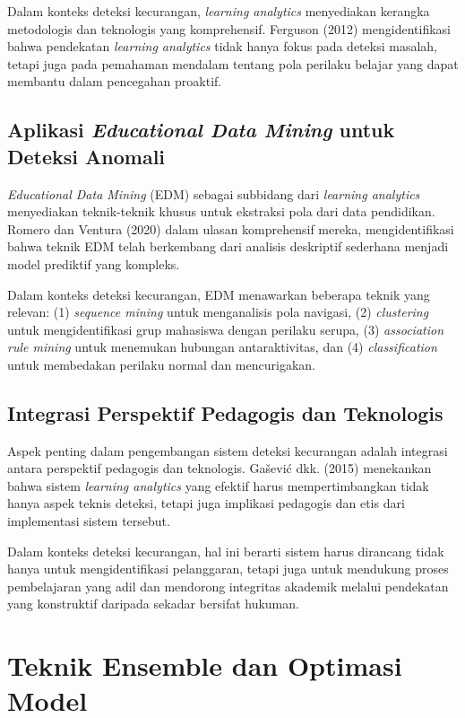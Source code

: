 Dalam konteks deteksi kecurangan, \textit{learning analytics} menyediakan kerangka metodologis dan teknologis yang komprehensif. Ferguson (2012) mengidentifikasi bahwa pendekatan \textit{learning analytics} tidak hanya fokus pada deteksi masalah, tetapi juga pada pemahaman mendalam tentang pola perilaku belajar yang dapat membantu dalam pencegahan proaktif.

\subsection{Aplikasi \textit{Educational Data Mining} untuk Deteksi Anomali}

\textit{Educational Data Mining} (EDM) sebagai subbidang dari \textit{learning analytics} menyediakan teknik-teknik khusus untuk ekstraksi pola dari data pendidikan. Romero dan Ventura (2020) dalam ulasan komprehensif mereka, mengidentifikasi bahwa teknik EDM telah berkembang dari analisis deskriptif sederhana menjadi model prediktif yang kompleks.

Dalam konteks deteksi kecurangan, EDM menawarkan beberapa teknik yang relevan: (1) \textit{sequence mining} untuk menganalisis pola navigasi, (2) \textit{clustering} untuk mengidentifikasi grup mahasiswa dengan perilaku serupa, (3) \textit{association rule mining} untuk menemukan hubungan antaraktivitas, dan (4) \textit{classification} untuk membedakan perilaku normal dan mencurigakan.

\subsection{Integrasi Perspektif Pedagogis dan Teknologis}

Aspek penting dalam pengembangan sistem deteksi kecurangan adalah integrasi antara perspektif pedagogis dan teknologis. Gašević dkk. (2015) menekankan bahwa sistem \textit{learning analytics} yang efektif harus mempertimbangkan tidak hanya aspek teknis deteksi, tetapi juga implikasi pedagogis dan etis dari implementasi sistem tersebut.

Dalam konteks deteksi kecurangan, hal ini berarti sistem harus dirancang tidak hanya untuk mengidentifikasi pelanggaran, tetapi juga untuk mendukung proses pembelajaran yang adil dan mendorong integritas akademik melalui pendekatan yang konstruktif daripada sekadar bersifat hukuman.

\section{Teknik Ensemble dan Optimasi Model}
\label{sec:ensembleTechniques}

